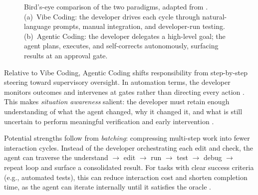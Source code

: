 \begin{figure}[H]

  \caption[Bird’s-Eye Comparison of Vibe Coding and Agentic Coding]{Bird’s-eye comparison of the two paradigms, adapted from \textcite{sapkota2025vibecoding}. (a)~Vibe Coding: the developer drives each cycle through natural-language prompts, manual integration, and developer-run testing. (b)~Agentic Coding: the developer delegates a high-level goal; the agent plans, executes, and self-corrects autonomously, surfacing results at an approval gate.}
  \label{fig:birdeye-comparison}
\end{figure}

Relative to Vibe Coding, Agentic Coding shifts responsibility from step-by-step steering toward supervisory oversight. In automation terms, the developer monitors outcomes and intervenes at gates rather than directing every action \parencite[pp.~289--291]{parasuraman2000model, vscodeCopilotAgentMode}. This makes \emph{situation awareness} salient: the developer must retain enough understanding of what the agent changed, why it changed it, and what is still uncertain to perform meaningful verification and early intervention \parencite{endsley1995situation}.


Potential strengths follow from \emph{batching}: compressing multi-step work into fewer interaction cycles. Instead of the developer orchestrating each edit and check, the agent can traverse the understand $\rightarrow$ edit $\rightarrow$ run $\rightarrow$ test $\rightarrow$ debug $\rightarrow$ repeat loop and surface a consolidated result. For tasks with clear success criteria (e.g., automated tests), this can reduce interaction cost and shorten completion time, as the agent can iterate internally until it satisfies the oracle \parencite{sarkar2025codewithme}.

